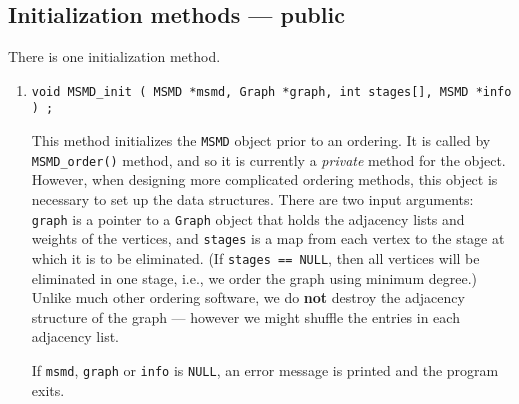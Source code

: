 \subsection{Initialization methods --- public}
\label{subsection:MSMD:proto:init}
\par
There is one initialization method.
\par
\begin{enumerate}
\item
\begin{verbatim}
void MSMD_init ( MSMD *msmd, Graph *graph, int stages[], MSMD *info ) ;
\end{verbatim}
This method initializes the {\tt MSMD} object prior to an ordering.
It is called by {\tt MSMD\_order()} method, and so it is currently
a {\it private} method for the object.
However, when designing more complicated ordering methods, this
object is necessary to set up the data structures.
There are two input arguments:
{\tt graph} is a pointer to a {\tt Graph} object that holds the
adjacency lists and weights of the vertices, 
and {\tt stages} is a map from each
vertex to the stage at which it is to be eliminated.
(If {\tt stages == NULL}, then all vertices will be eliminated in
one stage, i.e., we order the graph using minimum degree.)
Unlike much other ordering software, we do {\bf not} destroy the
adjacency structure of the graph --- however we might shuffle the
entries in each adjacency list.
\par {}
If {\tt msmd}, {\tt graph} or {\tt info} is {\tt NULL},
an error message is printed and the program exits.
\end{enumerate}
\par
